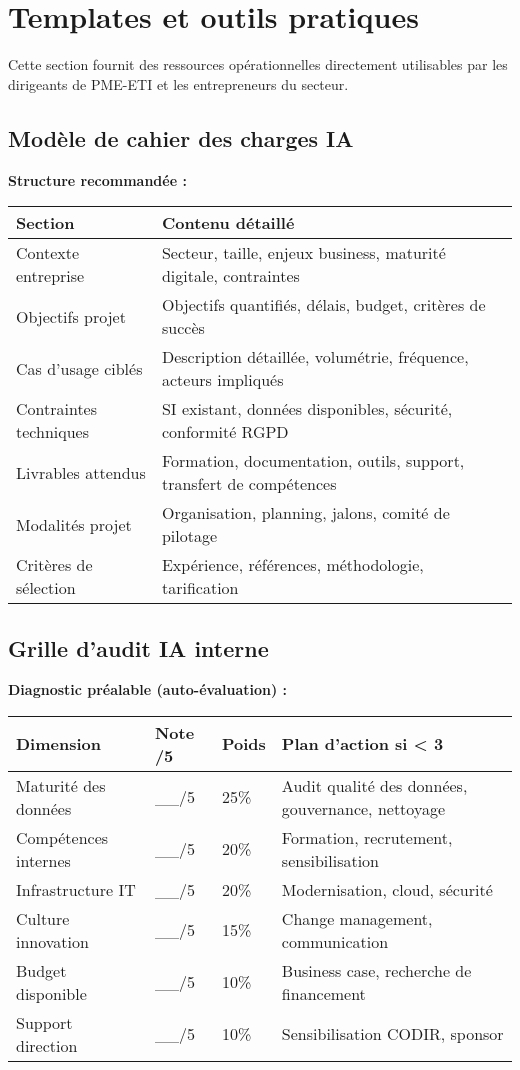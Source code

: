\section{Templates et outils pratiques}

Cette section fournit des ressources opérationnelles directement utilisables par les dirigeants de PME-ETI et les entrepreneurs du secteur.

\subsection{Modèle de cahier des charges IA}

\textbf{Structure recommandée :}

\begin{longtable}{@{}p{3cm}p{11cm}@{}}
\toprule
\textbf{Section} & \textbf{Contenu détaillé} \\
\midrule
Contexte entreprise & Secteur, taille, enjeux business, maturité digitale, contraintes \\
Objectifs projet & Objectifs quantifiés, délais, budget, critères de succès \\
Cas d'usage ciblés & Description détaillée, volumétrie, fréquence, acteurs impliqués \\
Contraintes techniques & SI existant, données disponibles, sécurité, conformité RGPD \\
Livrables attendus & Formation, documentation, outils, support, transfert de compétences \\
Modalités projet & Organisation, planning, jalons, comité de pilotage \\
Critères de sélection & Expérience, références, méthodologie, tarification \\
\bottomrule
\end{longtable}

\subsection{Grille d'audit IA interne}

\textbf{Diagnostic préalable (auto-évaluation) :}

\begin{longtable}{@{}p{4cm}p{2cm}p{2cm}p{6cm}@{}}
\toprule
\textbf{Dimension} & \textbf{Note /5} & \textbf{Poids} & \textbf{Plan d'action si < 3} \\
\midrule
Maturité des données & \_\_/5 & 25\% & Audit qualité des données, gouvernance, nettoyage \\
Compétences internes & \_\_/5 & 20\% & Formation, recrutement, sensibilisation \\
Infrastructure IT & \_\_/5 & 20\% & Modernisation, cloud, sécurité \\
Culture innovation & \_\_/5 & 15\% & Change management, communication \\
Budget disponible & \_\_/5 & 10\% & Business case, recherche de financement \\
Support direction & \_\_/5 & 10\% & Sensibilisation CODIR, sponsor \\
\bottomrule
\end{longtable}

